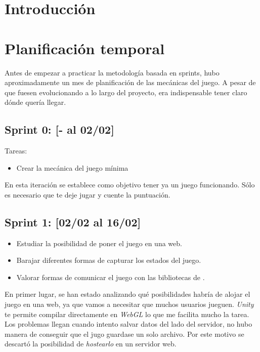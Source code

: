 
\section{Introducción}



\section{Planificación temporal}

Antes de empezar a practicar la metodología basada en sprints, hubo aproximadamente un mes de planificación de las mecánicas del juego. A pesar de que fuesen evolucionando a lo largo del proyecto, era indispensable tener claro dónde quería llegar.


\subsection{Sprint 0: [- al 02/02] }
Tareas:
\begin{itemize}
    \item Crear la mecánica del juego mínima
\end{itemize}


En esta iteración se establece como objetivo tener ya un juego funcionando. Sólo es necesario que te deje jugar y cuente la puntuación.

\subsection{Sprint 1: [02/02 al 16/02]}

\begin{itemize}
     \item Estudiar la posibilidad de poner el juego en una web. 
     \item Barajar diferentes formas de capturar los estados del juego. \item Valorar formas de comunicar el juego con las bibliotecas de .
\end{itemize}

En primer lugar, se han estado analizando qué posibilidades habría de alojar el juego en una web, ya que vamos a necesitar que muchos usuarios jueguen. \emph{Unity} te permite compilar directamente en \emph{WebGL} lo que me facilita mucho la tarea. Los problemas llegan cuando intento salvar datos del lado del servidor, no hubo manera de conseguir que el jugo guardase un solo archivo. Por este motivo se descartó la posibilidad de \emph{hostearlo} en un servidor web.


